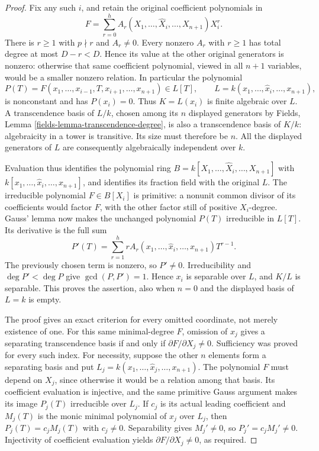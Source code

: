 \begin{proof}
Fix any such $i$, and retain the original coefficient
polynomials in
$$
F=\sum_{r=0}^h A_r(X_1,\ldots,\widehat X_i,\ldots,X_{n+1})X_i^r.
$$
There is $r\geq1$ with $p\nmid r$ and $A_r\neq0$.
Every nonzero $A_r$ with $r\geq1$ has total degree
at most $D-r<D$. Hence its value at the other original
generators is nonzero: otherwise that same coefficient
polynomial, viewed in all $n+1$ variables, would be a
smaller nonzero relation. In particular the polynomial
$$
P(T)=F(x_1,\ldots,x_{i-1},T,x_{i+1},\ldots,x_{n+1})
\in L[T],\qquad
L=k(x_1,\ldots,\widehat x_i,\ldots,x_{n+1}),
$$
is nonconstant and has $P(x_i)=0$. Thus $K=L(x_i)$
is finite algebraic over $L$. A transcendence basis of
$L/k$, chosen among its $n$ displayed generators by
Fields, Lemma \ref{fields-lemma-transcendence-degree},
is also a transcendence basis of $K/k$: algebraicity
in a tower is transitive. Its size must therefore be
$n$. All the displayed generators of $L$ are consequently
algebraically independent over $k$.

Evaluation thus identifies the polynomial ring
$B=k[X_1,\ldots,\widehat X_i,\ldots,X_{n+1}]$
with $k[x_1,\ldots,\widehat x_i,\ldots,x_{n+1}]$,
and identifies its fraction field with the original $L$.
The irreducible polynomial $F\in B[X_i]$ is primitive:
a nonunit common divisor of its coefficients would
factor $F$, with the other factor still of positive
$X_i$-degree. Gauss' lemma now makes the unchanged
polynomial $P(T)$ irreducible in $L[T]$.
Its derivative is the full sum
$$
P'(T)=\sum_{r=1}^h r A_r(x_1,\ldots,\widehat x_i,\ldots,x_{n+1})T^{r-1}.
$$
The previously chosen term is nonzero, so $P'\neq0$.
Irreducibility and $\deg P'<\deg P$ give
$\gcd(P,P')=1$. Hence $x_i$ is separable over $L$,
and $K/L$ is separable. This proves the assertion,
also when $n=0$ and the displayed basis of $L=k$ is empty.

The proof gives an exact criterion for every omitted
coordinate, not merely existence of one. For this same
minimal-degree $F$, omission of $x_j$ gives a separating
transcendence basis if and only if
$\partial F/\partial X_j\neq0$. Sufficiency was proved
for every such index. For necessity, suppose the other
$n$ elements form a separating basis and put
$L_j=k(x_1,\ldots,\widehat x_j,\ldots,x_{n+1})$.
The polynomial $F$ must depend on $X_j$, since otherwise
it would be a relation among that basis. Its coefficient
evaluation is injective, and the same primitive Gauss
argument makes its image $P_j(T)$ irreducible over $L_j$.
If $c_j$ is its actual leading coefficient and $M_j(T)$
is the monic minimal polynomial of $x_j$ over $L_j$,
then $P_j(T)=c_jM_j(T)$ with $c_j\neq0$. Separability
gives $M_j'\neq0$, so $P_j'=c_jM_j'\neq0$.
Injectivity of coefficient evaluation yields
$\partial F/\partial X_j\neq0$, as required.


\end{proof}
